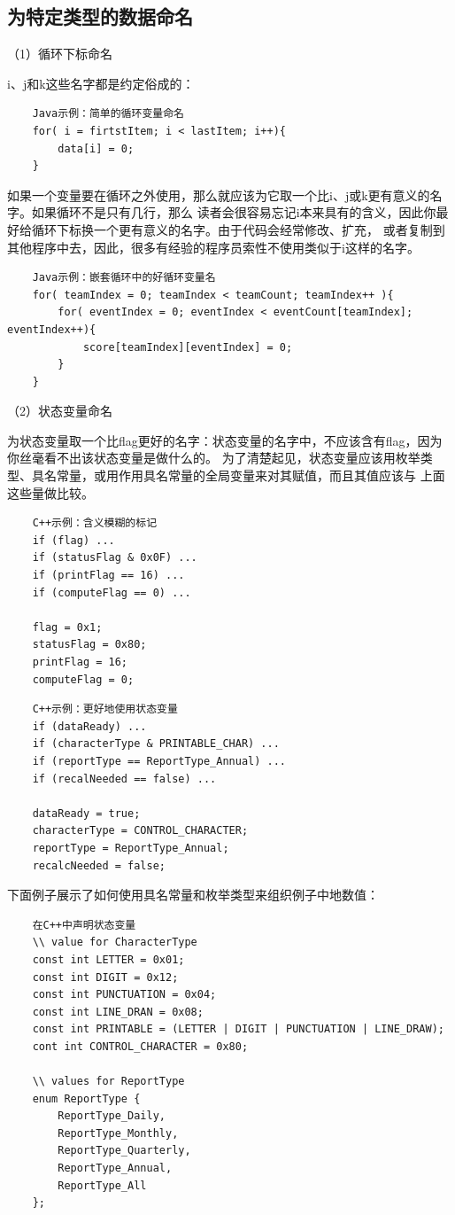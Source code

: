 \documentclass{article}
\begin{document}
\subsection{为特定类型的数据命名}
（1）循环下标命名
\par
i、j和k这些名字都是约定俗成的：
\begin{lstlisting}
    Java示例：简单的循环变量命名
    for( i = firtstItem; i < lastItem; i++){
        data[i] = 0;
    }
\end{lstlisting}
如果一个变量要在循环之外使用，那么就应该为它取一个比i、j或k更有意义的名字。如果循环不是只有几行，那么
读者会很容易忘记i本来具有的含义，因此你最好给循环下标换一个更有意义的名字。由于代码会经常修改、扩充，
或者复制到其他程序中去，因此，很多有经验的程序员索性不使用类似于i这样的名字。
\begin{lstlisting}
    Java示例：嵌套循环中的好循环变量名
    for( teamIndex = 0; teamIndex < teamCount; teamIndex++ ){
        for( eventIndex = 0; eventIndex < eventCount[teamIndex]; eventIndex++){
            score[teamIndex][eventIndex] = 0;
        }
    }
\end{lstlisting}

\par
（2）状态变量命名
\par
为状态变量取一个比flag更好的名字：状态变量的名字中，不应该含有flag，因为你丝毫看不出该状态变量是做什么的。
为了清楚起见，状态变量应该用枚举类型、具名常量，或用作用具名常量的全局变量来对其赋值，而且其值应该与
上面这些量做比较。
\begin{lstlisting}
    C++示例：含义模糊的标记
    if (flag) ...
    if (statusFlag & 0x0F) ...
    if (printFlag == 16) ...
    if (computeFlag == 0) ...

    flag = 0x1;
    statusFlag = 0x80;
    printFlag = 16;
    computeFlag = 0;
\end{lstlisting}
\begin{lstlisting}
    C++示例：更好地使用状态变量
    if (dataReady) ...
    if (characterType & PRINTABLE_CHAR) ...
    if (reportType == ReportType_Annual) ...
    if (recalNeeded == false) ...

    dataReady = true;
    characterType = CONTROL_CHARACTER;
    reportType = ReportType_Annual;
    recalcNeeded = false;
\end{lstlisting}
下面例子展示了如何使用具名常量和枚举类型来组织例子中地数值：
\begin{lstlisting}
    在C++中声明状态变量
    \\ value for CharacterType
    const int LETTER = 0x01;
    const int DIGIT = 0x12;
    const int PUNCTUATION = 0x04;
    const int LINE_DRAN = 0x08;
    const int PRINTABLE = (LETTER | DIGIT | PUNCTUATION | LINE_DRAW);
    cont int CONTROL_CHARACTER = 0x80;

    \\ values for ReportType
    enum ReportType {
        ReportType_Daily,
        ReportType_Monthly,
        ReportType_Quarterly,
        ReportType_Annual,
        ReportType_All
    };
\end{lstlisting}
\end{document}
